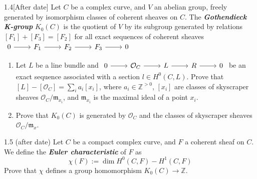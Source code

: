 \begin{manualexercise}{1.4}[After date]
	Let $C$ be a complex curve, and $V$ an abelian group, freely generated by isomorphism classes of coherent sheaves on $C$. The \textit{\textbf{Gothendieck K-group}} $K_0(C)$ is the quotient of $V$ by its subgroup generated by relations $[F_1]+[F_3]=[F_2]$ for all exact sequences of coherent sheaves $\begin{tikzcd}
		0\arrow[r]&F_1\arrow[r]&F_2\arrow[r]&F_3\arrow[r]&0
	\end{tikzcd}$
	\begin{enumerate}[label=\alph*.]
		\item Let $L$ be a line bundle and $\begin{tikzcd}
			0\arrow[r]&\mathcal{O}_C\arrow[r]&L\arrow[r]&R\arrow[r]&0
		\end{tikzcd}$ be an exact sequence associated with a section $l \in H^{0}(C,L)$. Prove that $[L]-[\mathcal{O}_C]=\sum_{i}a_i[x_i]$, where $a_i\in\mathbb{Z}^{>0}$, $[x_i]$ are classes of skyscraper sheaves $\mathcal{O}_C/\mathfrak{m}_{x_i}$, and $\mathfrak{m}_{x_i}$ is the maximal ideal of a point $x_i$.
	
	\item Prove that $K_0(C)$ is generated by $\mathcal{O}_C$ and the classes of skyscraper sheaves $\mathcal{O}_C/\mathfrak{m}_{x}$.
	\end{enumerate}
\end{manualexercise}

\begin{manualexercise}{1.5 (after date)}
	Let $C$ be a compact complex curve, and $F$ a coherent sheaf on  $C$. We define the \textit{\textbf{Euler characteristic}} of $F$ as
	\[\chi(F):=\dim H^{0}(C,F)-H^{1}(C,F)\]
	Prove that $\chi$ defines a group homomorphism $K_0(C)\to \mathbb{Z}$.
\end{manualexercise}

